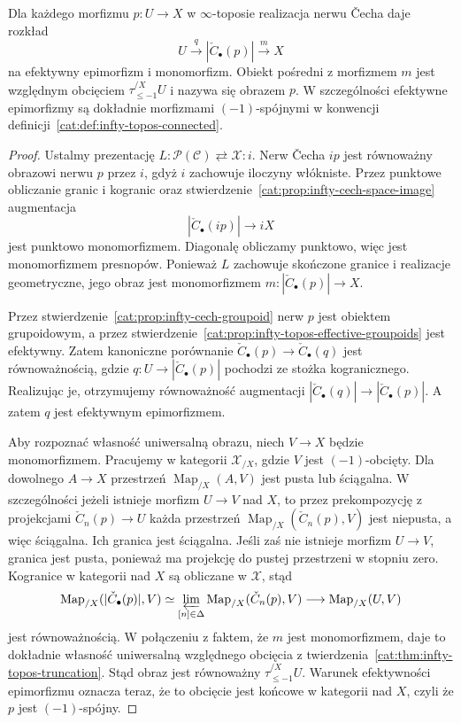 \begin{twierdzenie}\label{cat:thm:infty-topos-image}
Dla każdego morfizmu $p:U\to X$ w $\infty$-toposie realizacja nerwu Čecha daje rozkład
\[
 U\xrightarrow{q}|\check C_\bullet(p)|\xrightarrow{m}X
\]
na efektywny epimorfizm i monomorfizm. Obiekt pośredni z morfizmem $m$ jest względnym obcięciem $\tau_{\leq-1}^{/X}U$ i nazywa się obrazem $p$. W szczególności efektywne epimorfizmy są dokładnie morfizmami $(-1)$-spójnymi w konwencji definicji~\ref{cat:def:infty-topos-connected}.
\end{twierdzenie}
\begin{proof}
Ustalmy prezentację $L:\mathcal P(\mathcal C)\rightleftarrows\mathcal X:i$. Nerw Čecha $ip$ jest równoważny obrazowi nerwu $p$ przez $i$, gdyż $i$ zachowuje iloczyny włókniste. Przez punktowe obliczanie granic i kogranic oraz stwierdzenie~\ref{cat:prop:infty-cech-space-image} augmentacja
\[
 |\check C_\bullet(ip)|\longrightarrow iX
\]
jest punktowo monomorfizmem. Diagonalę obliczamy punktowo, więc jest monomorfizmem presnopów. Ponieważ $L$ zachowuje skończone granice i realizacje geometryczne, jego obraz jest monomorfizmem $m:|\check C_\bullet(p)|\to X$.

Przez stwierdzenie~\ref{cat:prop:infty-cech-groupoid} nerw $p$ jest obiektem grupoidowym, a przez stwierdzenie~\ref{cat:prop:infty-topos-effective-groupoids} jest efektywny. Zatem kanoniczne porównanie $\check C_\bullet(p)\to\check C_\bullet(q)$ jest równoważnością, gdzie $q:U\to|\check C_\bullet(p)|$ pochodzi ze stożka kogranicznego. Realizując je, otrzymujemy równoważność augmentacji $|\check C_\bullet(q)|\to|\check C_\bullet(p)|$. A zatem $q$ jest efektywnym epimorfizmem.

Aby rozpoznać własność uniwersalną obrazu, niech $V\to X$ będzie monomorfizmem. Pracujemy w kategorii $\mathcal X_{/X}$, gdzie $V$ jest $(-1)$-obcięty. Dla dowolnego $A\to X$ przestrzeń $\operatorname{Map}_{/X}(A,V)$ jest pusta lub ściągalna. W szczególności jeżeli istnieje morfizm $U\to V$ nad $X$, to przez prekompozycję z projekcjami $\check C_n(p)\to U$ każda przestrzeń $\operatorname{Map}_{/X}(\check C_n(p),V)$ jest niepusta, a więc ściągalna. Ich granica jest ściągalna. Jeśli zaś nie istnieje morfizm $U\to V$, granica jest pusta, ponieważ ma projekcję do pustej przestrzeni w stopniu zero. Kogranice w kategorii nad $X$ są obliczane w $\mathcal X$, stąd
\[
 \operatorname{Map}_{/X}(|\check C_\bullet(p)|,V)
 \simeq\varprojlim_{[n]\in\Delta}\operatorname{Map}_{/X}(\check C_n(p),V)
 \longrightarrow\operatorname{Map}_{/X}(U,V)
\]
jest równoważnością. W połączeniu z faktem, że $m$ jest monomorfizmem, daje to dokładnie własność uniwersalną względnego obcięcia z twierdzenia~\ref{cat:thm:infty-topos-truncation}. Stąd obraz jest równoważny $\tau_{\leq-1}^{/X}U$. Warunek efektywności epimorfizmu oznacza teraz, że to obcięcie jest końcowe w kategorii nad $X$, czyli że $p$ jest $(-1)$-spójny.
\end{proof}

